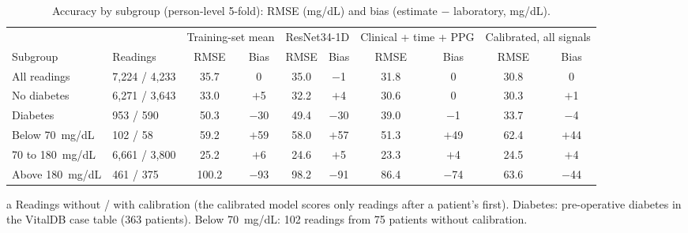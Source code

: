 \documentclass[10pt]{article}
\newcommand{\mgdl}{mg/dL}
\begin{document}
\begin{table}[H]
\centering\footnotesize\setlength{\tabcolsep}{3.2pt}
\begin{threeparttable}
\caption{Accuracy by subgroup (person-level 5-fold): RMSE (\mgdl{}) and bias (estimate $-$ laboratory, \mgdl{}).}
\label{tab:subgroups}
\begin{tabular}{@{}llcccccccc@{}}
\toprule
& & \multicolumn{2}{c}{Training-set mean} & \multicolumn{2}{c}{ResNet34-1D} & \multicolumn{2}{c}{Clinical + time + PPG} & \multicolumn{2}{c}{Calibrated, all signals} \\
\cmidrule(lr){3-4}\cmidrule(lr){5-6}\cmidrule(lr){7-8}\cmidrule(l){9-10}
Subgroup & Readings\tnote{a} & RMSE & Bias & RMSE & Bias & RMSE & Bias & RMSE & Bias \\
\midrule
All readings & 7,224 / 4,233 & 35.7 & 0 & 35.0 & $-$1 & 31.8 & 0 & 30.8 & 0 \\
No diabetes & 6,271 / 3,643 & 33.0 & $+$5 & 32.2 & $+$4 & 30.6 & 0 & 30.3 & $+$1 \\
Diabetes & 953 / 590 & 50.3 & $-$30 & 49.4 & $-$30 & 39.0 & $-$1 & 33.7 & $-$4 \\
Below 70~\mgdl{} & 102 / 58 & 59.2 & $+$59 & 58.0 & $+$57 & 51.3 & $+$49 & 62.4 & $+$44 \\
70 to 180~\mgdl{} & 6,661 / 3,800 & 25.2 & $+$6 & 24.6 & $+$5 & 23.3 & $+$4 & 24.5 & $+$4 \\
Above 180~\mgdl{} & 461 / 375 & 100.2 & $-$93 & 98.2 & $-$91 & 86.4 & $-$74 & 63.6 & $-$44 \\
\bottomrule
\end{tabular}
\begin{tablenotes}\footnotesize
\item[a] Readings without / with calibration (the calibrated model scores only readings after a patient's first). Diabetes: pre-operative diabetes in the VitalDB case table (363 patients). Below 70~\mgdl{}: 102 readings from 75 patients without calibration.
\end{tablenotes}
\end{threeparttable}
\end{table}
\end{document}

